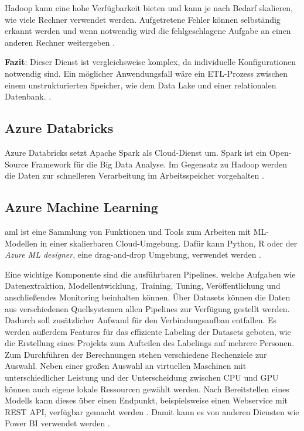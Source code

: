Hadoop kann eine hohe Verfügbarkeit bieten und kann je nach Bedarf skalieren, wie viele Rechner verwendet werden. Aufgetretene Fehler können selbständig erkannt werden und wenn notwendig wird die fehlgeschlagene Aufgabe an einen anderen Rechner weitergeben \cite{klein_iot_2017}.

\textbf{Fazit}: Dieser Dienst ist vergleichsweise komplex, da individuelle Konfigurationen notwendig sind. Ein möglicher Anwendungsfall wäre ein ETL-Prozess zwischen einem unstrukturierten Speicher, wie dem Data Lake und einer relationalen Datenbank. \cite[vgl.][]{klein_iot_2017}.


\subsection{Azure Databricks} \label{sec:grundlagen:azure_dienste:databricks}
Azure Databricks setzt Apache Spark als Cloud-Dienst um. Spark ist ein Open-Source Framework für die Big Data Analyse. Im Gegensatz zu Hadoop werden die Daten zur schnelleren Verarbeitung im Arbeitsspeicher vorgehalten \cite{soh_data_2020}.


\subsection{Azure Machine Learning} \label{sec:grundlagen:azure_dienste:machineLearning}
\ac{aml} ist eine Sammlung von Funktionen und Tools zum Arbeiten mit ML-Modellen in einer skalierbaren Cloud-Umgebung. Dafür kann Python, R oder der \textit{Azure ML designer}, eine drag-and-drop Umgebung, verwendet werden \cite{soh_data_2020}.

Eine wichtige Komponente sind die ausführbaren Pipelines, welche Aufgaben wie Datenextraktion, Modellentwicklung, Training, Tuning, Veröffentlichung und anschließendes Monitoring beinhalten können. Über Datasets können die Daten aus verschiedenen Quellsystemen allen Pipelines zur Verfügung gestellt werden. Dadurch soll zusätzlicher Aufwand für den Verbindungsaufbau entfallen. Es werden außerdem Features für das effiziente Labeling der Datasets geboten, wie die Erstellung eines Projekts zum Aufteilen des Labelings auf mehrere Personen. Zum Durchführen der Berechnungen stehen verschiedene Rechenziele zur Auswahl. Neben einer großen Auswahl an virtuellen Maschinen mit unterschiedlicher Leistung und der Unterscheidung zwischen CPU und GPU können auch eigene lokale Ressourcen gewählt werden. Nach Bereitstellen eines Modells kann dieses über einen Endpunkt, beispielsweise einen Webservice mit REST API, verfügbar gemacht werden \cite{price_azure_2021}. Damit kann es von anderen Diensten wie Power BI verwendet werden \cite{kemp_tutorial_2021}.

